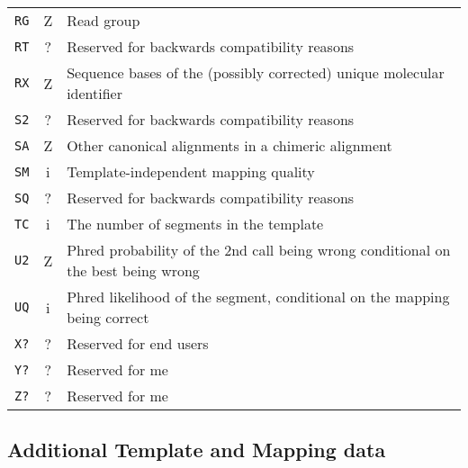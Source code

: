 \documentclass[10pt]{article}
\begin{document}
\begin{center}
\begin{longtable}{ccp{12.5cm}}
  {\tt RG} & Z & Read group \\
  {\tt RT} & ? & Reserved for backwards compatibility reasons \\
  {\tt RX} & Z & Sequence bases of the (possibly corrected) unique molecular identifier \\
  {\tt S2} & ? & Reserved for backwards compatibility reasons \\
  {\tt SA} & Z & Other canonical alignments in a chimeric alignment \\
  {\tt SM} & i & Template-independent mapping quality \\
  {\tt SQ} & ? & Reserved for backwards compatibility reasons \\
  {\tt TC} & i & The number of segments in the template \\
  {\tt U2} & Z & Phred probability of the 2nd call being wrong conditional on the best being wrong \\
  {\tt UQ} & i & Phred likelihood of the segment, conditional on the mapping being correct \\
  {\tt X?} & ? & Reserved for end users \\
  {\tt Y?} & ? & Reserved for me \\
  {\tt Z?} & ? & Reserved for me \\
  \hline
\end{longtable}
\end{center}

\subsection{Additional Template and Mapping data}
\end{document}
